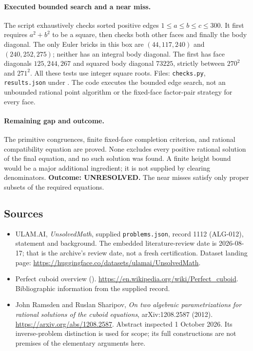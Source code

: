 \documentclass[11pt,a4paper]{article}
\begin{document}
\paragraph{Executed bounded search and a near miss.}
The script exhaustively checks sorted positive edges
$1\le a\le b\le c\le300$. It first requires $a^2+b^2$ to be a
square, then checks both other faces and finally the body diagonal.
The only Euler bricks in this box are $(44,117,240)$ and
$(240,252,275)$; neither has an integral body diagonal. The first has
face diagonals $125,244,267$ and squared body diagonal $73225$,
strictly between $270^2$ and $271^2$. All these tests use integer
square roots. Files: \texttt{checks.py}, \texttt{results.json} under
.
The code executes the bounded edge search, not an unbounded rational
point algorithm or the fixed-face factor-pair strategy for every face.

\paragraph{Remaining gap and outcome.}
The primitive congruences, finite fixed-face completion criterion, and
rational compatibility equation are proved. None excludes every
positive rational solution of the final equation, and no such solution
was found. A finite height bound would be a major additional ingredient;
it is not supplied by clearing denominators. \textbf{Outcome: UNRESOLVED.}
The near misses satisfy only proper subsets of the required equations.

\subsection{Sources}

{\small

\begin{itemize}

\item[\hypertarget{source:1112:1}{S1}] ULAM.AI, \emph{UnsolvedMath}, supplied \texttt{problems.json}, record 1112 (ALG-012), statement and background. The embedded literature-review date is 2026-08-17; that is the archive’s review date, not a fresh certification. Dataset landing page: \url{https://huggingface.co/datasets/ulamai/UnsolvedMath}.

\item[\hypertarget{source:1112:2}{S2}] Perfect cuboid overview (). \url{https://en.wikipedia.org/wiki/Perfect_cuboid}. Bibliographic information from the supplied record.


\item[E1] John Ramsden and Ruslan Sharipov,
\emph{On two algebraic parametrizations for rational solutions of the
cuboid equations}, arXiv:1208.2587 (2012).
\url{https://arxiv.org/abs/1208.2587}. Abstract inspected 1 October 2026.
Its inverse-problem distinction is used for scope; its full constructions
are not premises of the elementary arguments here.

\end{itemize}

}

\label{end:1112}
\end{document}
